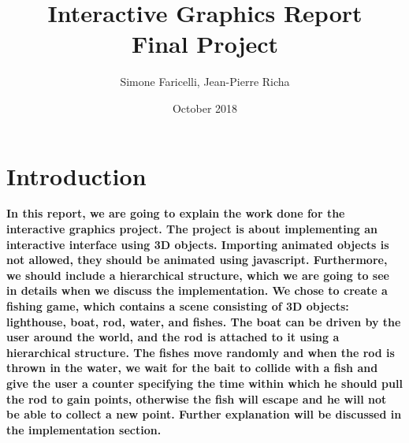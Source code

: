 \documentclass[10pt]{article}
\begin{document}
\title{Interactive Graphics Report\\
    Final Project}
\author{Simone Faricelli, Jean-Pierre Richa}
\date{October 2018}
\maketitle
\section {Introduction}
\textbf {In this report, we are going to explain the work done for the interactive graphics project.
The project is about implementing an interactive interface using 3D objects. Importing animated objects is not allowed, they should be animated using javascript. Furthermore, we should include a hierarchical structure, which we are going to see in details when we discuss the implementation. We chose to create a fishing game, which contains a scene consisting of 3D objects: lighthouse, boat, rod, water, and fishes. The boat can be driven by the user around the world, and the rod is attached to it using a hierarchical structure. The fishes move randomly and when the rod is thrown in the water, we wait for the bait to collide with a fish and give the user a counter specifying the time within which he should pull the rod to gain points, otherwise the fish will escape and he will not be able to collect a new point. Further explanation will be discussed in the implementation section.}
\end{document}
